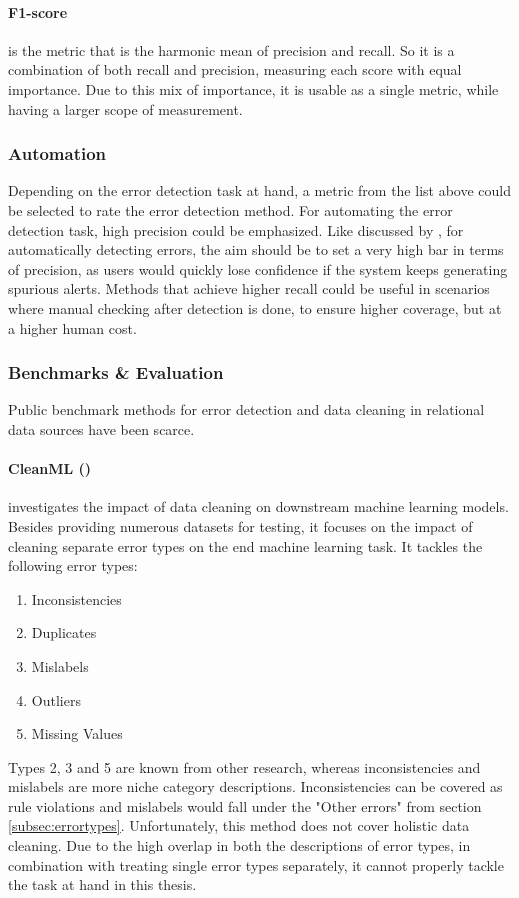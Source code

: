 \paragraph{F1-score}
is the metric that is the harmonic mean of precision and recall. So it is a combination of both recall and precision, measuring each score with equal importance. Due to this mix of importance, it is usable as a single metric, while having a larger scope of measurement.

\subsubsection{Automation}
Depending on the error detection task at hand, a metric from the list above could be selected to rate the error detection method. For automating the error detection task, high precision could be emphasized. 
Like discussed by \cite{Huang2018-er}, for automatically detecting errors, the aim should be to set a very high bar in terms of
precision, as users would quickly lose confidence if the system keeps
generating spurious alerts. Methods that achieve higher recall could be useful in scenarios where manual checking after detection is done, to ensure higher coverage, but at a higher human cost.

\subsubsection{Benchmarks \& Evaluation}
Public benchmark methods for error detection and data cleaning in relational data sources have been scarce. 
\paragraph{CleanML (\cite{Li2019-ve})} investigates the impact of data cleaning on downstream machine learning models. Besides providing numerous datasets for testing, it focuses on the impact of cleaning separate error types on the end machine learning task. It tackles the following error types:
\begin{enumerate}
    \item Inconsistencies
    \item Duplicates
    \item Mislabels
    \item Outliers
    \item Missing Values
\end{enumerate}
Types 2, 3 and 5 are known from other research, whereas inconsistencies and mislabels are more niche category descriptions. Inconsistencies can be covered as rule violations and mislabels would fall under the "Other errors" from section \ref{subsec:errortypes}. Unfortunately, this method does not cover holistic data cleaning. Due to the high overlap in both the descriptions of error types, in combination with treating single error types separately, it cannot properly tackle the task at hand in this thesis.

